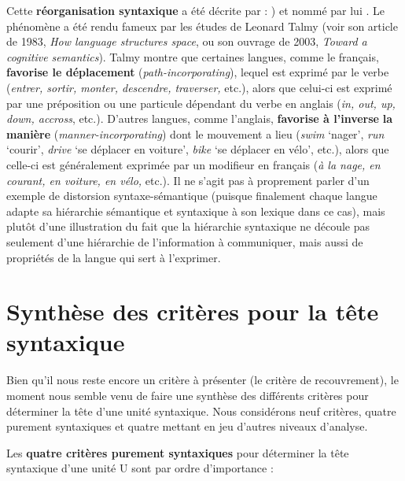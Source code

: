 {    Cette \textbf{réorganisation syntaxique} a été décrite par \citet{tesniere1959elements} : ) et nommé par lui . Le phénomène a été rendu fameux par les études de Leonard Talmy (voir son article de 1983, \textit{How language structures space}, ou son ouvrage de 2003, \textit{Toward a cognitive semantics}). Talmy montre que certaines langues, comme le français, \textbf{favorise le déplacement} (\textit{path-incorporating}), lequel est exprimé par le verbe (\textit{entrer, sortir, monter, descendre, traverser,} etc.), alors que celui-ci est exprimé par une préposition ou une particule dépendant du verbe en anglais (\textit{in, out, up, down, accross}, etc.). D’autres langues, comme l’anglais, \textbf{favorise à l’inverse} \textbf{la manière} (\textit{manner-incorporating}) dont le mouvement a lieu (\textit{swim} ‘nager’, \textit{run} ‘courir’, \textit{drive} ‘se déplacer en voiture’, \textit{bike} ‘se déplacer en vélo’, etc.), alors que celle-ci est généralement exprimée par un modifieur en français (\textit{à la nage, en courant, en voiture, en vélo,} etc.). Il ne s’agit pas à proprement parler d’un exemple de distorsion syntaxe-sémantique (puisque finalement chaque langue adapte sa hiérarchie sémantique et syntaxique à son lexique dans ce cas), mais plutôt d’une illustration du fait que la hiérarchie syntaxique ne découle pas seulement d’une hiérarchie de l’information à communiquer, mais aussi de propriétés de la langue qui sert à l’exprimer.
}
\section{Synthèse des critères pour la tête syntaxique}\label{sec:3.3.20}

Bien qu’il nous reste encore un critère à présenter (le critère de recouvrement), le moment nous semble venu de faire une synthèse des différents critères pour déterminer la tête d’une unité syntaxique. Nous considérons neuf critères, quatre purement syntaxiques et quatre mettant en jeu d’autres niveaux d’analyse.

Les \textbf{quatre critères purement syntaxiques} pour déterminer la tête syntaxique d’une unité U sont par ordre d’importance :


